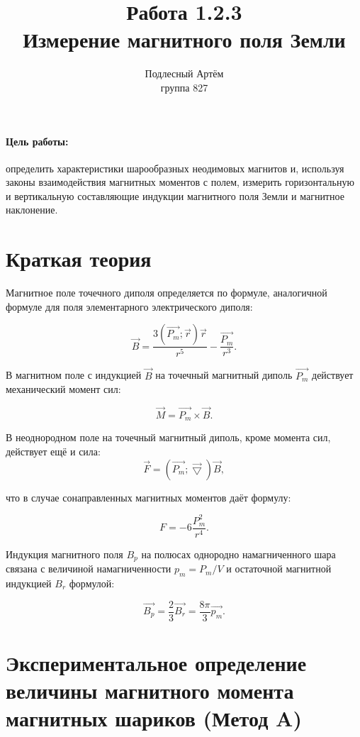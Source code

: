 \documentclass[a4paper, 14pt]{extarticle}%
\author{Подлесный Артём \\ группа 827}
\title{Работа 1.2.3 \\ Измерение магнитного поля Земли}
\begin{document}
\maketitle
\paragraph*{Цель работы:}определить характеристики шарообразных неодимовых магнитов и, используя
законы взаимодействия магнитных моментов с полем, измерить горизонтальную и вертикальную
составляющие индукции магнитного поля Земли и магнитное наклонение.
\section*{Краткая теория}

Магнитное поле точечного диполя определяется по формуле, аналогичной формуле для поля
элементарного электрического диполя:

\begin{equation}
\vec{B} = \frac{3(\vec{P_m};\vec{r})\vec{r}}{r^5}-\frac{\vec{P_m}}{r^3}.
\end{equation}

В магнитном поле с индукцией $\vec{B}$ на точечный магнитный диполь $\vec{P_m}$ действует механический момент сил:


\begin{equation}
\vec{M} = \vec{P_m} \times \vec{B}.
\end{equation}

В неоднородном поле на точечный магнитный диполь, кроме момента сил, действует ещё и сила:
\begin{equation}
\vec{F} = (\vec{P_m};\vec{\bigtriangledown})\vec{B},
\end{equation}

что в случае сонаправленных магнитных моментов даёт формулу:

\begin{equation}
F = -6\frac{P_m^2}{r^4}.
\end{equation}

Индукция магнитного поля $B_p$ на полюсах однородно намагниченного шара связана с величиной намагниченности $p_m = P_m/V$
и остаточной магнитной индукцией $B_r$
формулой:

\[\vec{B_p} = \frac{2}{3} \vec{B_r} = \frac{8\pi}{3} \vec{p_m} .\]

\section*{Экспериментальное определение величины магнитного момента магнитных шариков (Метод A)}
\end{document}

